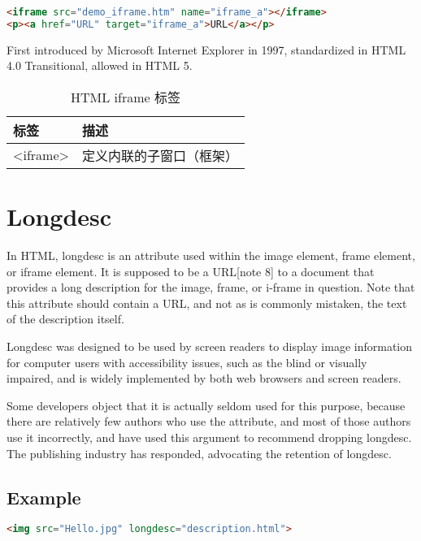 \begin{lstlisting}[language=HTML]
<iframe src="demo_iframe.htm" name="iframe_a"></iframe>
<p><a href="URL" target="iframe_a">URL</a></p>
\end{lstlisting}

First introduced by Microsoft Internet Explorer in 1997, standardized in HTML 4.0 Transitional, allowed in HTML 5.


\begin{table}[!h]
\centering
\caption{HTML iframe 标签}
\begin{tabular}{|l|l|}
\hline
标签		&描述\\
\hline
<iframe>	&定义内联的子窗口（框架）\\
\hline
\end{tabular}
\end{table}

\section{Longdesc}

In HTML, longdesc is an attribute used within the image element, frame element, or iframe element. It is supposed to be a URL[note 8] to a document that provides a long description for the image, frame, or i-frame in question. Note that this attribute should contain a URL, and not as is commonly mistaken, the text of the description itself.

Longdesc was designed to be used by screen readers to display image information for computer users with accessibility issues, such as the blind or visually impaired, and is widely implemented by both web browsers and screen readers.

 Some developers object that it is actually seldom used for this purpose, because there are relatively few authors who use the attribute, and most of those authors use it incorrectly, and have used this argument to recommend dropping longdesc. The publishing industry has responded, advocating the retention of longdesc.




\subsection{Example}



\begin{lstlisting}[language=HTML]
<img src="Hello.jpg" longdesc="description.html">
\end{lstlisting}

